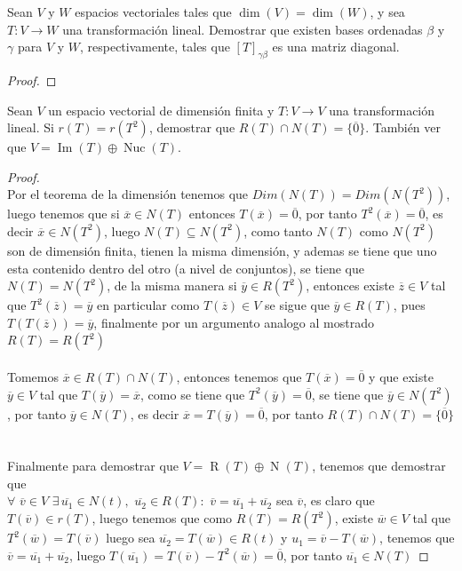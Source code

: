 \documentclass[11pt]{article}
\numberwithin{equation}{section}
\begin{document}
\begin{Problema}{} Sean $V$ y $W$ espacios vectoriales tales que $\dim(V) = \dim(W)$, y sea $T: V \to W$ una transformación lineal. 
    Demostrar que existen bases ordenadas $\beta$ y $\gamma$ para $V$ y $W$, respectivamente, tales que $[T]_{\gamma \beta}$ es una matriz diagonal.
\end{Problema}      
\begin{proof}
    
\end{proof}

\begin{Problema}{} Sean $V$ un espacio vectorial de dimensión finita y $T: V \to V$ una transformación lineal. 
    Si $r(T) = r(T^2)$, demostrar que $R(T) \cap N(T) = \{\overline{0}\}$. También ver que $V = \operatorname{Im}(T) \oplus \operatorname{Nuc}(T)$.
\end{Problema}
\begin{proof}\,\\
    Por el teorema de la dimensión tenemos que $Dim(N(T))=Dim(N(T^2))$, luego tenemos que
    si $\overline{x}\in N(T)$ entonces $T(\overline{x})=\overline{0}$, por tanto $T^2(\overline{x})=\overline{0}$,
    es decir $\overline{x}\in N(T^2)$, luego $N(T)\subseteq N(T^2)$, como tanto
    $N(T)$ como $N(T^2)$ son de dimensión finita, tienen la misma dimensión, y ademas
    se tiene que uno esta contenido dentro del otro (a nivel de conjuntos), se tiene que $N(T)=N(T^2)$, de la misma manera si $\overline{y}\in R(T^2)$, entonces
    existe $\overline{z}\in V$ tal que $T^2(\overline{z})=\overline{y}$ en particular
    como $T(\overline{z})\in V$ se sigue que $\overline{y}\in R(T)$, pues $T(T(\overline{z}))=\overline{y}$, finalmente
    por un argumento analogo al mostrado $R(T)=R(T^2)$\,\\
    \,\\
    Tomemos $\overline{x}\in R(T) \cap N(T) $, entonces tenemos que $T(\overline{x})=\overline{0}$ y que existe $\overline{y}\in V$ tal 
    que $T(\overline{y})=\overline{x}$, como se tiene que $T^2(\overline{y})=\overline{0}$, se tiene que $\overline{y}\in N(T^2)$, por tanto
    $\overline{y}\in N(T)$, es decir $\overline{x}=T(\overline{y})=\overline{0}$, por tanto $R(T) \cap N(T) = \{\overline{0}\}$\,\\
    \,\\
    Finalmente para demostrar que $V = \operatorname{R}(T) \oplus \operatorname{N}(T)$, tenemos que demostrar que\\ $\forall\,\,\overline{v}\in V\,\,\exists\,\overline{u_1}\in N(t),\,\,\overline{u_2}\in R(T):\,\,\overline{v}=\overline{u_1}+\overline{u_2}$
    sea $\overline{v}$, es claro que $T(\overline{v})\in r(T)$, luego tenemos que como $R(T)=R(T^2)$, existe $\overline{w}\in V$ tal que $T^2(\overline{w})=T(\overline{v})$
    luego sea $\overline{u_2}=T(\overline{w})\in R(t)$ y $u_1=\overline{v}-T(\overline{w})$, tenemos que
    $\overline{v}=\overline{u_1}+\overline{u_2}$, luego $T(\overline{u_1})=T(\overline{v})-T^2(\overline{w})=\overline{0}$, por tanto
    $\overline{u_1}\in N(T)$ 
\end{proof}
\,\\
\end{document}
